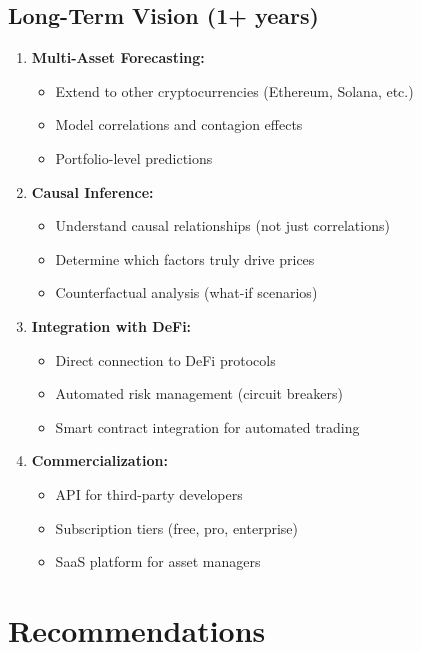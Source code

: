 \subsection{Long-Term Vision (1+ years)}

\begin{enumerate}
    \item \textbf{Multi-Asset Forecasting:}
    \begin{itemize}
        \item Extend to other cryptocurrencies (Ethereum, Solana, etc.)
        \item Model correlations and contagion effects
        \item Portfolio-level predictions
    \end{itemize}
    
    \item \textbf{Causal Inference:}
    \begin{itemize}
        \item Understand causal relationships (not just correlations)
        \item Determine which factors truly drive prices
        \item Counterfactual analysis (what-if scenarios)
    \end{itemize}
    
    \item \textbf{Integration with DeFi:}
    \begin{itemize}
        \item Direct connection to DeFi protocols
        \item Automated risk management (circuit breakers)
        \item Smart contract integration for automated trading
    \end{itemize}
    
    \item \textbf{Commercialization:}
    \begin{itemize}
        \item API for third-party developers
        \item Subscription tiers (free, pro, enterprise)
        \item SaaS platform for asset managers
    \end{itemize}
\end{enumerate}

\section{Recommendations}

